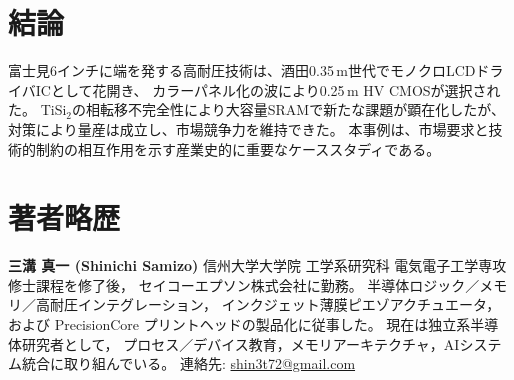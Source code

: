 \documentclass[conference]{IEEEtran}
\begin{document}
\section{結論}
富士見6インチに端を発する高耐圧技術は、酒田0.35\,\textmu m世代でモノクロLCDドライバICとして花開き、  
カラーパネル化の波により0.25\,\textmu m HV CMOSが選択された。  
TiSi$_2$の相転移不完全性により大容量SRAMで新たな課題が顕在化したが、対策により量産は成立し、市場競争力を維持できた。  
本事例は、市場要求と技術的制約の相互作用を示す産業史的に重要なケーススタディである。




\section*{著者略歴}
\noindent\textbf{三溝 真一 (Shinichi Samizo)}  
信州大学大学院 工学系研究科 電気電子工学専攻修士課程を修了後，  
セイコーエプソン株式会社に勤務。  
半導体ロジック／メモリ／高耐圧インテグレーション，  
インクジェット薄膜ピエゾアクチュエータ，  
および PrecisionCore プリントヘッドの製品化に従事した。  
現在は独立系半導体研究者として，  
プロセス／デバイス教育，メモリアーキテクチャ，AIシステム統合に取り組んでいる。  
連絡先: \href{mailto:shin3t72@gmail.com}{shin3t72@gmail.com}
\end{document}
